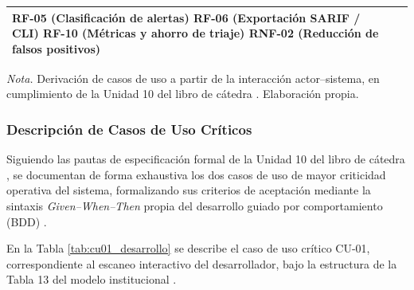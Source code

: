 \begin{table}[H]
\begin{tabularx}{\textwidth}{>{\raggedright\arraybackslash}p{3.4cm} >{\raggedright\arraybackslash}p{4.6cm} >{\raggedright\arraybackslash}X}
RF-05 (Clasificación de alertas) \newline
RF-06 (Exportación SARIF / CLI) \newline
RF-10 (Métricas y ahorro de triaje) \newline
RNF-02 (Reducción de falsos positivos) \\
\bottomrule
\end{tabularx}
\vspace{2pt}
\begin{flushleft}
\scriptsize \textit{Nota.} Derivación de casos de uso a partir de la interacción actor--sistema, en cumplimiento de la Unidad 10 del libro de cátedra \parencite{torres2026proyecto}. Elaboración propia. %
\end{flushleft}
\end{table}

\subsubsection{Descripción de Casos de Uso Críticos}
Siguiendo las pautas de especificación formal de la Unidad 10 del libro de cátedra \parencite{torres2026proyecto}, se documentan de forma exhaustiva los dos casos de uso de mayor criticidad operativa del sistema, formalizando sus criterios de aceptación mediante la sintaxis \textit{Given--When--Then} propia del desarrollo guiado por comportamiento (BDD) \parencite{wiegers2013software}. %

En la Tabla \ref{tab:cu01_desarrollo} se describe el caso de uso crítico CU-01, correspondiente al escaneo interactivo del desarrollador, bajo la estructura de la Tabla 13 del modelo institucional \parencite{torres2026proyecto}. %

